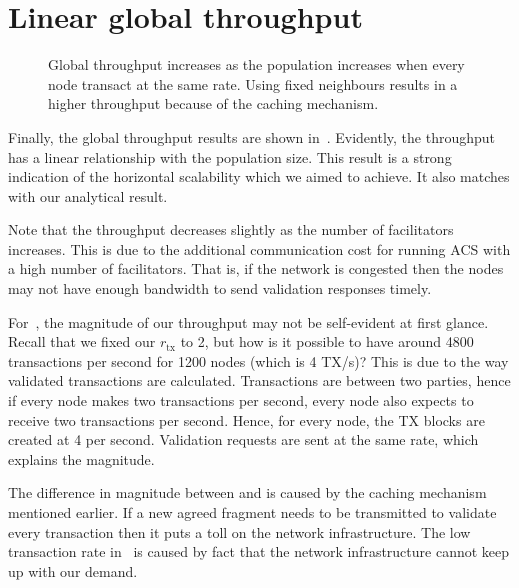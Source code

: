 \section{Linear global throughput}
\begin{figure}[h]
  \centering
  \caption{Global throughput increases as the population increases when every node transact at the same rate.
  Using fixed neighbours results in a higher throughput because of the caching mechanism.}
  \label{fig:global-throughput}
\end{figure}


Finally, the global throughput results are shown in~.
Evidently, the throughput has a linear relationship with the population size.
This result is a strong indication of the horizontal scalability which we aimed to achieve.
It also matches with our analytical result.

Note that the throughput decreases slightly as the number of facilitators increases.
This is due to the additional communication cost for running ACS with a high number of facilitators.
That is, if the network is congested then the nodes may not have enough bandwidth to send validation responses timely.

For~,
the magnitude of our throughput may not be self-evident at first glance.
Recall that we fixed our $r_\text{tx}$ to 2, but how is it possible to have around 4800 transactions per second for 1200 nodes (which is 4 TX/s)?
This is due to the way validated transactions are calculated.
Transactions are between two parties, hence if every node makes two transactions per second,
every node also expects to receive two transactions per second.
Hence, for every node, the TX blocks are created at 4 per second.
Validation requests are sent at the same rate, which explains the magnitude.

The difference in magnitude between  and  is caused by the caching mechanism mentioned earlier.
If a new agreed fragment needs to be transmitted to validate every transaction then it puts a toll on the network infrastructure.
The low transaction rate in~ is caused by fact that the network infrastructure cannot keep up with our demand.

